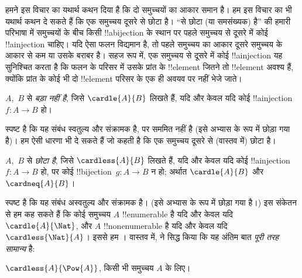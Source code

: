 \documentclass[../../../include/open-logic-section]{subfiles}
\begin{document}


\begin{explain}
हमने इस विचार का यथार्थ कथन दिया है कि दो समुच्चयों का आकार समान है। हम इस
विचार का भी यथार्थ कथन दे सकते हैं कि एक समुच्चय दूसरे से छोटा है। ``से छोटा
(या समसंख्यक) है'' की हमारी परिभाषा में समुच्चयों के बीच किसी
!!a{bijection} के स्थान पर पहले समुच्चय से दूसरे में कोई !!a{injection}
चाहिए। यदि ऐसा फलन विद्यमान है, तो पहले समुच्चय का आकार दूसरे समुच्चय के आकार
से कम या उसके बराबर है। सहज रूप में, एक समुच्चय से दूसरे में कोई
!!a{injection} यह सुनिश्चित करता है कि फलन के परिसर में उसके प्रांत के
!!{element} जितने तो !!{element} अवश्य हैं, क्योंकि प्रांत के कोई भी दो
!!{element} परिसर के एक ही अवयव पर नहीं भेजे जाते।
\end{explain}

\begin{defn}
$A$,~$B$ से \emph{बड़ा नहीं है}, जिसे $\cardle{A}{B}$ लिखते हैं, यदि और केवल
यदि कोई !!a{injection} $f \colon A \to B$ हो।
\end{defn}

स्पष्ट है कि यह संबंध स्वतुल्य और संक्रामक है, पर सममित नहीं है (इसे अभ्यास
के रूप में छोड़ा गया है)। हम ऐसी धारणा भी दे सकते हैं जो कहती है कि एक
समुच्चय दूसरे से (वास्तव में) छोटा है।

\begin{defn}
$A$,~$B$ से \emph{छोटा है}, जिसे $\cardless{A}{B}$ लिखते हैं, यदि और केवल
यदि कोई !!a{injection}~$f\colon A \to B$ हो, पर कोई !!{bijection}~$g\colon A
\to B$ न हो; अर्थात $\cardle{A}{B}$ और $\cardneq{A}{B}$।
\end{defn}

स्पष्ट है कि यह संबंध अस्वतुल्य और संक्रामक है। (इसे अभ्यास के रूप में छोड़ा
गया है।) इस संकेतन से हम कह सकते हैं कि कोई समुच्चय $A$ !!{enumerable} है
यदि और केवल यदि $\cardle{A}{\Nat}$, और $A$ !!{nonenumerable} है यदि और केवल
यदि $\cardless{\Nat}{A}$। इससे हम
। वास्तव में, \citet{Cantor1892} ने
सिद्ध किया कि यह अंतिम बात \emph{पूरी तरह सामान्य} है:

\begin{thm}[कैंटर]
$\cardless{A}{\Pow{A}}$, किसी भी समुच्चय $A$ के लिए।
\end{thm}
\end{document}
